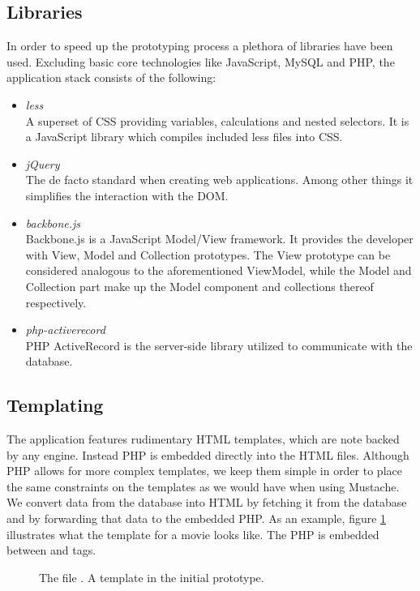 \subsection{Libraries}
In order to speed up the prototyping process a plethora of libraries have been
used. Excluding basic core technologies like JavaScript, MySQL and PHP, the
application stack consists of the following:
\begin{itemize}
	\item \emph{less}\\
	A superset of CSS providing variables, calculations and nested selectors. It
	is a JavaScript library which compiles included less files into CSS.
	\item \emph{jQuery}\\
	The de facto standard when creating web applications. Among other things it
	simplifies the interaction with the DOM.
	\item \emph{backbone.js}\\
	Backbone.js is a JavaScript Model/View framework. It provides the developer
	with View, Model and Collection prototypes. The View prototype can be
	considered analogous to the aforementioned ViewModel, while the Model and
	Collection part make up the Model component and collections thereof
	respectively.
	\item \emph{php-activerecord}\\
	PHP ActiveRecord is the server-side library utilized to communicate with the
	database.
\end{itemize}

\subsection{Templating}
The application features rudimentary HTML templates, which are note backed by
any engine. Instead PHP is embedded directly into the HTML files.
Although PHP allows for more complex templates, we keep them simple in order to
place the same constraints on the templates as we would have when using
Mustache.
We convert data from the database into HTML by fetching it from the database and
by forwarding that data to the embedded PHP.
As an example, figure \ref{fig:movie.view.tpl} illustrates what the template
for a movie looks like.
The PHP is embedded between  and  tags.

\begin{figure}
	\label{fig:movie.view.tpl}
	\centering
	
	\caption{
		The file .
		A template in the initial prototype.}
\end{figure}

